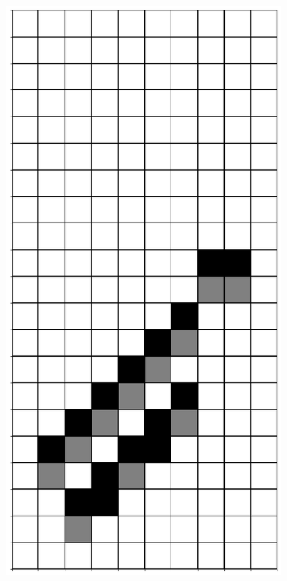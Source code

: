 \documentclass[12pt]{article}
\numberwithin{figure}{section} %
\begin{document}
\begin{figure}[H]
\begin{subfigure}{0.3\textwidth}
     		\subcaption{}
   	\end{subfigure}
      	\newline
   	\setcounter{subfigure}{0}
	\begin{subfigure}[t]{0.03\textwidth}
		\phantom{B}
  	\end{subfigure}	
         \begin{subfigure}{0.3\textwidth}
     		\centering
     		\includegraphics[angle=270,width=\linewidth]{Section4/23.0}

\end{subfigure}
\end{figure}
\end{document}
